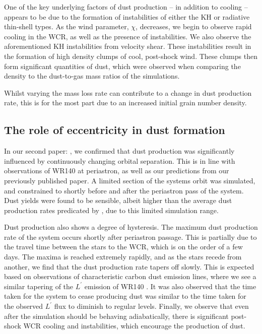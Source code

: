 One of the key underlying factors of dust production -- in addition to cooling -- appears to be due to the formation of instabilities of either the KH or radiative thin-shell types.
As the wind parameter, $\chi$, decreases, we begin to observe rapid cooling in the WCR, as well as the presence of instabilities.
We also observe the aforementioned KH instabilities from velocity shear.
These instabilities result in the formation of high density clumps of cool, post-shock wind.
These clumps then form significant quantities of dust, which were observed when comparing the density to the dust-to-gas mass ratios of the simulations.

Whilst varying the mass loss rate can contribute to a change in dust production rate, this is for the most part due to an increased initial grain number density.

\subsection{The role of eccentricity in dust formation}

In our second paper: \emph{\secondpapertitle}, we confirmed that dust production was significantly influenced by continuously changing orbital separation.
This is in line with observations of WR140 at periastron, as well as our predictions from our previously published paper.
A limited section of the systems orbit was simulated, and constrained to shortly before and after the periastron pass of the system.
Dust yields were found to be sensible, albeit higher than the average dust production rates predicated by \textcite{lauRevisitingImpactDust2020}, due to this limited simulation range.

Dust production also shows a degree of hysteresis.
The maximum dust production rate of the system occurs shortly after periastron passage.
This is partially due to the travel time between the stars to the WCR, which is on the order of a few days.
The maxima is reached extremely rapidly, and as the stars recede from another, we find that the dust production rate tapers off slowly.
This is expected based on observations of characteristic carbon dust emission lines, where we see a similar tapering of the $L^\prime$ emission of WR140 \parencite{crowther_dust_2003}.
It was also observed that the time taken for the system to cease producing dust was similar to the time taken for the observed $L^\prime$ flux to diminish to regular levels.
Finally, we observe that even after the simulation should be behaving adiabatically, there is significant post-shock WCR cooling and instabilities, which encourage the production of dust.

